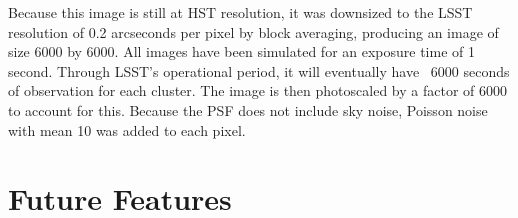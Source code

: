 \documentclass[10pt,twoside]{article}
\theoremstyle{definition}
\theoremstyle{exercise}
\begin{document}
Because this image is still at HST resolution, it was downsized to the LSST resolution of 0.2 arcseconds per pixel by block averaging, producing an image of size 6000 by 6000. All images have been simulated for an exposure time of 1 second. Through LSST's operational period, it will eventually have ~6000 seconds of observation for each cluster. The image is then photoscaled by a factor of 6000 to account for this. Because the PSF does not include sky noise, Poisson noise with mean 10 was added to each pixel.

\section{Future Features}
\end{document}
